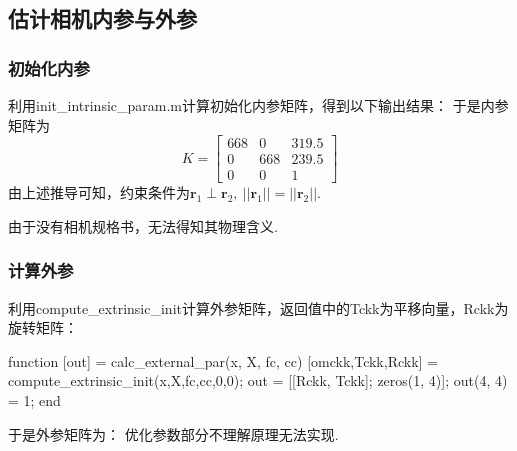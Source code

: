 \documentclass[12pt, a4paper, oneside]{ctexart}
\numberwithin{equation}{section}  %
\def\bd{\boldsymbol}        %
\begin{document}
\subsection{估计相机内参与外参}
\subsubsection{初始化内参}
利用init\_intrinsic\_param.m计算初始化内参矩阵，得到以下输出结果：
于是内参矩阵为
\begin{equation*}
    K = \left[\begin{matrix}
        668&0&319.5\\
        0&668&239.5\\
        0&0&1
    \end{matrix}\right]
\end{equation*}
由上述推导可知，约束条件为$\bd{r}_1\perp \bd{r}_2,\ ||\bd{r}_1|| = ||\bd{r}_2||$.

由于没有相机规格书，无法得知其物理含义.
\subsubsection{计算外参}
利用compute\_extrinsic\_init计算外参矩阵，返回值中的Tckk为平移向量，Rckk为旋转矩阵：
\begin{matlabcode}
function [out] = calc_external_par(x, X, fc, cc)
    [omckk,Tckk,Rckk] = compute_extrinsic_init(x,X,fc,cc,0,0);
    out = [[Rckk, Tckk]; zeros(1, 4)];
    out(4, 4) = 1;
end
\end{matlabcode}
于是外参矩阵为：
优化参数部分不理解原理无法实现.
\end{document}
